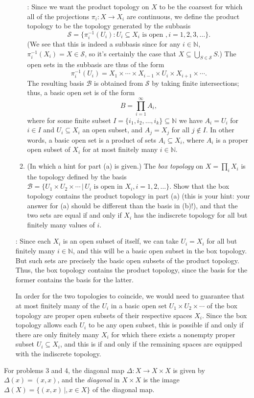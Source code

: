 \documentclass[letterpaper,12pt]{article}
\newcommand{\N}{\mathbb{N}}
\begin{document}
\begin{enumerate}
\begin{enumerate}
\bigskip

: Since we want the product topology on $X$ to be the coarsest for which all of the projections $\pi_i:X\to X_i$ are continuous, we define the product topology to be the topology generated by the subbasis
\[
 \mathcal{S} = \{\pi_i^{-1}(U_i) : U_i\subseteq X_i \text{ is open }, i=1,2,3,\ldots\}.
\]
(We see that this is indeed a subbasis since for any $i\in\N$, $\pi_i^{-1}(X_i) = X\in \mathcal{S}$, so it's certainly the case that $X\subseteq \bigcup_{S\in\mathcal{S}}S$.) The open sets in the subbasis are thus of the form
\[
 \pi_i^{-1}(U_i) = X_1\times \cdots \times X_{i-1}\times U_i \times X_{i+1}\times\cdots.
\]
The resulting basis $\mathcal{B}$ is obtained from $\mathcal{S}$ by taking finite intersections; thus, a basic open set is of the form
\[
 B = \prod_{i=1}^\infty A_i,
\]
where for some finite subset $I=\{i_1,i_2,\ldots, i_k\}\subseteq \N$ we have $A_i = U_i$ for $i\in I$ and $U_i\subseteq X_i$ an open subset, and $A_j = X_j$ for all $j\notin I$. In other words, a basic open set is a product of sets $A_i\subseteq X_i$, where $A_i$ is a proper open subset of $X_i$ for at most finitely many $i\in\N$.

\item (In which a hint for part (a) is given.) The {\em box topology} on $X=\prod_i X_i$ is the topology defined by the basis $\mathcal{B} = \{U_1\times U_2\times \cdots \,|\, U_i \text{ is open in } X_i, i=1,2,\ldots\}$. Show that the box topology contains the product topology in part (a) (this is your hint: your answer for (a) should be different than the basis in (b)!), and that the two sets are equal if and only if $X_i$ has the indiscrete topology for all but finitely many values of $i$.
\end{enumerate}

\bigskip

: Since each $X_i$ is an open subset of itself, we can take $U_i=X_i$ for all but finitely many $i\in\N$, and this will be a basic open subset in the box topology. But such sets are precisely the basic open subsets of the product topology. Thus, the box topology contains the product topology, since the basis for the former contains the basis for the latter.

In order for the two topologies to coincide, we would need to guarantee that at most finitely many of the $U_i$ in a basic open set $U_1\times U_2\times\cdots$ of the box topology are proper open subsets of their respective spaces $X_i$. Since the box topology allows each $U_i$ to be any open subset, this is possible if and only if there are only finitely many $X_i$ for which there exists a nonempty proper subset $U_i\subseteq X_i$, and this is if and only if the remaining spaces are equipped with the indiscrete topology.
\end{enumerate}
For problems 3 and 4, the diagonal map $\Delta:X\to X\times X$ is given by $\Delta(x) = (x,x)$, and the {\em diagonal} in $X\times X$ is the image $\Delta(X) = \{(x,x)\,|, x\in X\}$ of the diagonal map.
\end{document}
